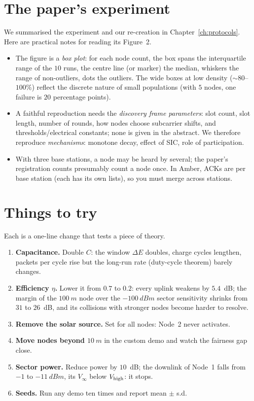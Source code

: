 \section{The paper's experiment}
\label{sec:paperexp}

We summarised the experiment and our re-creation in Chapter~\ref{ch:protocols}. Here are practical notes for reading its Figure~2.
\begin{itemize}
 \item The figure is a \emph{box plot}: for each node count, the box spans the interquartile range of the $10$ runs, the centre line (or marker) the median, whiskers the range of non-outliers, dots the outliers. The wide boxes at low density ($\sim80$--$100\%$) reflect the discrete nature of small populations (with $5$ nodes, one failure is $20$ percentage points).
 \item A faithful reproduction needs the \emph{discovery frame parameters}: slot count, slot length, number of rounds, how nodes choose subcarrier shifts, and thresholds/electrical constants; none is given in the abstract. We therefore reproduce \emph{mechanisms}: monotone decay, effect of SIC, role of participation.
 \item With three base stations, a node may be heard by several; the paper's registration counts presumably count a node once. In Amber, ACKs are per base station (each  has its own lists), so you must merge  across stations.
\end{itemize}

\section{Things to try}

Each is a one-line change that tests a piece of theory.
\begin{enumerate}
 \item \textbf{Capacitance.} Double $C$: the window $\Delta E$ doubles, charge cycles lengthen, packets per cycle rise but the long-run rate (duty-cycle theorem) barely changes.
 \item \textbf{Efficiency $\eta$.} Lower it from $0.7$ to $0.2$: every uplink weakens by $5.4$~dB; the margin of the $\SI{100}{m}$ node over the $\SI{-100}{dBm}$ sector sensitivity shrinks from $31$ to $26$~dB, and its collisions with stronger nodes become harder to resolve.
 \item \textbf{Remove the solar source.} Set  for all nodes: Node~2 never activates.
 \item \textbf{Move nodes beyond $\SI{10}{m}$} in the custom demo and watch the fairness gap close.
 \item \textbf{Sector power.} Reduce power by $10$~dB; the downlink of Node~1 falls from $-1$ to $\SI{-11}{dBm}$, its $V_\infty$ below $V_{\mathrm{high}}$: it stops.
 \item \textbf{Seeds.} Run any demo ten times and report mean $\pm$ s.d.
\end{enumerate}

